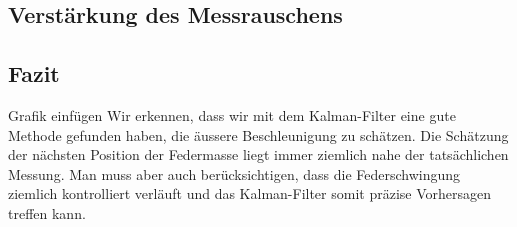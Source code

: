 \subsection{Verstärkung des Messrauschens}




\subsection{Fazit}
Grafik einfügen
Wir erkennen, dass wir mit dem Kalman-Filter eine gute Methode gefunden haben, die äussere Beschleunigung zu schätzen. Die Schätzung der nächsten Position der Federmasse liegt immer ziemlich nahe der tatsächlichen Messung. Man muss aber auch berücksichtigen, dass die Federschwingung ziemlich kontrolliert verläuft und das Kalman-Filter somit präzise Vorhersagen treffen kann.
